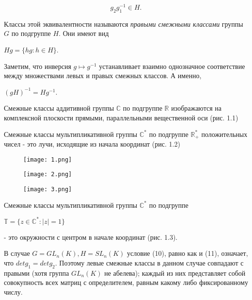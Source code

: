 \begin{equation}
g_2 g_1^{-1} \in H.
\end{equation}

\noindent Классы этой эквивалентности называются \emph{правыми смежными классами} группы $G$ по подгруппе $H$. Они имеют вид

\begin{center}
$Hg = \{hg: h \in H\}$.            
\end{center}

Заметим, что инверсия $g \mapsto g^{-1}$ устанавливает взаимно однозначное соответствие между множествами левых и правых смежных классов. А именно,

\begin{center}
$(gH)^{-1} = Hg^{-1}$.            
\end{center}

\begin{example}
Смежные классы аддитивной группы $\mathbb{C}$ по подгруппе $\mathbb{R}$ изображаются на комплексной плоскости прямыми, параллельными вещественной оси (рис. 1.1)
\end{example}

\begin{example}
Смежные классы мультипликативной группы $\mathbb{C^*}$ по подгруппе $\mathbb{R_+^{*}}$ положительных чисел - это лучи, исходящие из начала координат (рис. 1.2)
\end{example}

\begin{figure}[H]
\begin{multicols}{3}
\hfill
\texttt{[image: 1.png]}
\hfill
\caption{}
\label{figLeft}
\hfill
\texttt{[image: 2.png]}
\hfill
\caption{}
\label{figCenter}
\hfill
\texttt{[image: 3.png]}
\hfill
\caption{}
\label{figRight}
\end{multicols}
\end{figure}

\begin{example}
Смежные классы мультипликативной группы $\mathbb{C^*}$ по подгруппе
\begin{center}
$\mathbb{T} = \{z \in \mathbb{C^*}: |z| = 1\}$
\end{center}
- это окружности с центром в начале координат (рис. 1.3).
\end{example}

\begin{example}
В случае $G = GL_n(K), H = SL_n(K)$ условие (10), равно как и (11), означает, что $det g_1 = det g_2$. Поэтому левые смежные классы в данном случае совпадают с правыми (хотя группа $GL_n(K)$ не абелева); каждый из них представляет собой совокупность всех матриц с определителем, равным какому либо фиксированному числу.
\end{example}

